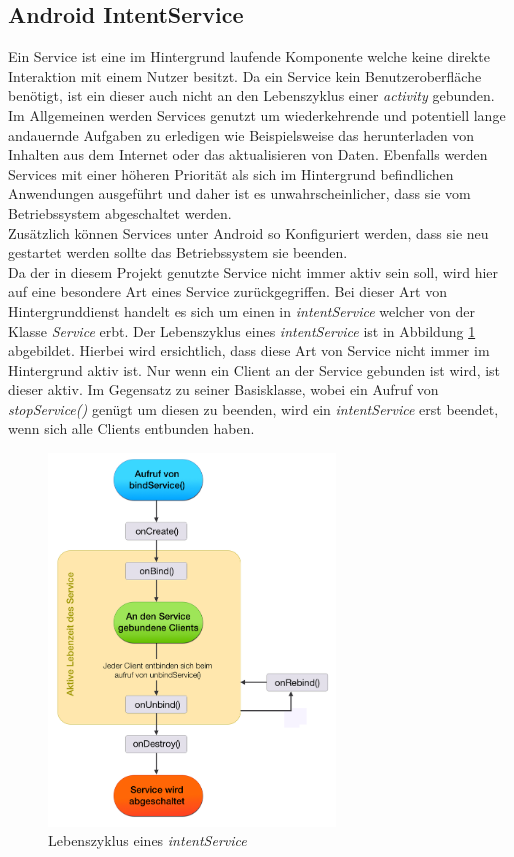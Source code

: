 \documentclass[]{report}
\begin{document}
\subsection{Android IntentService}
Ein Service ist eine im Hintergrund laufende Komponente welche keine direkte Interaktion mit einem Nutzer besitzt. Da ein Service kein Benutzeroberfläche benötigt, ist ein dieser auch nicht an den Lebenszyklus einer \textit{activity} gebunden. Im Allgemeinen werden Services genutzt um wiederkehrende und potentiell lange andauernde Aufgaben zu erledigen wie Beispielsweise das herunterladen von Inhalten aus dem Internet oder das aktualisieren von Daten. Ebenfalls werden Services mit einer höheren Priorität als sich im Hintergrund befindlichen Anwendungen ausgeführt und daher ist es unwahrscheinlicher, dass sie vom Betriebssystem abgeschaltet werden. \\
Zusätzlich können Services unter Android so Konfiguriert werden, dass sie neu gestartet werden sollte das Betriebssystem sie beenden. \\
Da der in diesem Projekt genutzte Service nicht immer aktiv sein soll, wird hier auf eine besondere Art eines Service zurückgegriffen. Bei dieser Art von Hintergrunddienst handelt es sich um einen in \textit{intentService} welcher von der Klasse \textit{Service} erbt. Der Lebenszyklus eines \textit{intentService} ist in Abbildung \ref{fig:lifetime} abgebildet. Hierbei wird ersichtlich, dass diese Art von Service nicht immer im Hintergrund aktiv ist. Nur wenn ein Client an der Service gebunden ist wird, ist dieser aktiv. Im Gegensatz zu seiner Basisklasse, wobei ein Aufruf von \textit{stopService()} genügt um diesen zu beenden, wird ein \textit{intentService} erst beendet, wenn sich alle Clients entbunden haben.
\begin{figure}
    \centering 
    \includegraphics[width=3.0in]{bilder/intentservice.png}
    \caption{Lebenszyklus eines \textit{intentService}}
    \label{fig:lifetime}
\end{figure}
\end{document}
